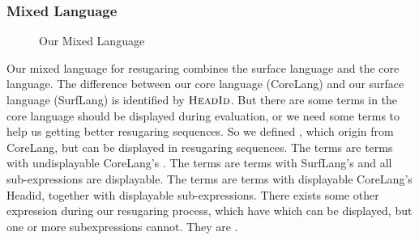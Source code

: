 \subsubsection{Mixed Language}

\begin{figure}[t]
\begin{centering}
	\framebox[36em][c]{
		\parbox[t]{33em}{
			\[
			\begin{array}{lcl}
			\m{Exp} &::=& \m{DisplayableExp}\\
			&|& \m{UndisplayableExp}\\
\\
			\m{DisplayableExp} &::=& \m{SurfExp}\\
			&|& \m{CommonExp}
\\
			\m{UndisplayableExp} &::=& \m{CoreExp}\\
			&|& \m{OtherSurfExp}\\
			&|& \m{OtherCommonExp}\\
\\
			\m{CoreExp} &::=& (\m{CoreHead}~\m{Exp}*)\\
\\
			\m{SurfExp} &::=& (\m{SurfHead}~\m{DisplayableExp}*)\\
\\
			\m{CommonExp} &::=& (\m{CommonHead}~\m{DisplayableExp}*)\\
			&|& c \qquad \note{// constant value}\\
			&|& x \qquad \note{// variable} \\
\\
			\m{OtherSurfExp} &::=& (\m{SurfHead}~\m{Exp}*~\m{UndisplayableExp}~\m{Exp}*)\\
\\
			\m{OtherCommonExp} &::=& (\m{CommonHead}~\m{Exp}*~\m{UndisplayableExp}~\m{Exp}*)
			\end{array}
			\]
		}
	}
\end{centering}
\caption{Our Mixed Language}
\label{fig:mix}
\end{figure}

Our mixed language for resugaring combines the surface language and the core language.
%
The difference between our core language (CoreLang) and our surface language (SurfLang) is identified by $\mbox{\sc HeadId}$. But there are some terms in the core language should be displayed during evaluation, or we need some terms to help us getting better resugaring sequences. So we defined , which origin from CoreLang, but can be displayed in resugaring sequences. The  terms are terms with undisplayable CoreLang's . The  terms are terms with SurfLang's  and all sub-expressions are displayable. The  terms are terms with displayable CoreLang's Headid, together with displayable sub-expressions. There exists some other expression during our resugaring process, which have  which can be displayed, but one or more subexpressions cannot. They are .

